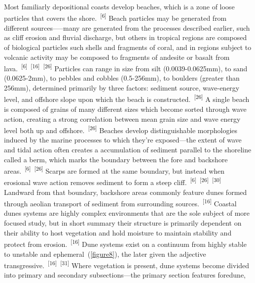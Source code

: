 \documentclass{article}
\begin{document}
\par{Most familiarly depositional coasts develop beaches, which is a zone of loose particles that covers the shore.~\textsuperscript{[6]} Beach particles may be generated from different sources—--many are generated from the processes described earlier, such as cliff erosion and fluvial discharge, but others in tropical regions are composed of biological particles such shells and fragments of coral, and in regions subject to volcanic activity may be composed to fragments of andesite or basalt from lava.~\textsuperscript{[6]}~\textsuperscript{[16]}~\textsuperscript{[26]} Particles can range in size from silt (0.0039-0.0625mm), to sand (0.0625-2mm), to pebbles and cobbles (0.5-256mm), to boulders (greater than 256mm), determined primarily by three factors: sediment source, wave-energy level, and offshore slope upon which the beach is constructed.~\textsuperscript{[26]} A single beach is composed of grains of many different sizes which become sorted through wave action, creating a strong correlation between mean grain size and wave energy level both up and offshore.~\textsuperscript{[26]} Beaches develop distinguishable morphologies induced by the marine processes to which they're exposed---the extent of wave and tidal action often creates a accumulation of sediment parallel to the shoreline called a berm, which marks the boundary between the fore and backshore areas.~\textsuperscript{[6]}~\textsuperscript{[26]} Scarps are formed at the same boundary, but instead when erosional wave action removes sediment to form a steep cliff.~\textsuperscript{[6]}~\textsuperscript{[26]}~\textsuperscript{[30]} Landward from that boundary, backshore areas commonly feature dunes formed through aeolian transport of sediment from surrounding sources.~\textsuperscript{[16]} Coastal dunes systems are highly complex environments that are the sole subject of more focused study, but in short summary their structure is primarily dependent on their ability to host vegetation and hold moisture to maintain stability and protect from erosion.~\textsuperscript{[16]} Dune systems exist on a continuum from highly stable to unstable and ephemeral~(\cref{figure8}), the later given the adjective transgressive.~\textsuperscript{[16]}~\textsuperscript{[31]} Where vegetation is present, dune systems become divided into primary and secondary subsections---the primary section features foredune, }
\end{document}
